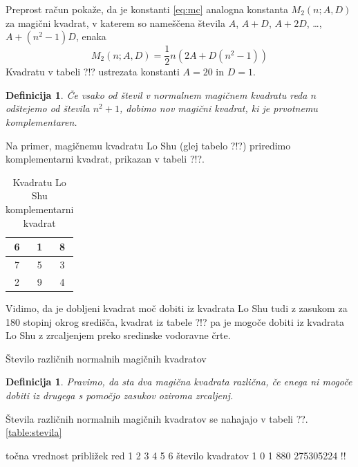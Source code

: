 \documentclass[a4paper,12pt]{article}
\newtheorem{definicija}[izrek]{Definicija}
\begin{document}
Preprost račun pokaže, da je konstanti \eqref{eq:mc} analogna konstanta
$M_2(n;A,D)$ za magični kvadrat, v katerem so nameščena števila
$A$, $A+D$, $A+2D$, \dots, $A+(n^2-1)D$, enaka 
\begin{equation}
   M_2(n; A, D) = \frac{1}{2} n \left( 2A + D(n^2 - 1) \right)
\end{equation}
Kvadratu v tabeli ?!? ustrezata konstanti $A=20$ in $D=1$.

\begin{definicija}
      Če vsako od števil v normalnem magičnem kvadratu reda $n$ odštejemo
      od števila $n^2+1$, dobimo nov magični kvadrat, ki je prvotnemu
      \emph{komplementaren}.
\end{definicija}

Na primer, magičnemu kvadratu Lo Shu (glej tabelo ?!?) priredimo
komplementarni kvadrat, prikazan v tabeli ?!?.
%
\begin{table}[!ht]
   \centering
   \caption{Kvadratu Lo Shu komplementarni kvadrat}
   \label{table:closhu}
   \large
   \begin{tabular}{|*{3}{c|}}
       \hline
       6 & 1 & 8 \\ \hline
       7 & 5 & 3 \\ \hline
       2 & 9 & 4 \\ \hline
   \end{tabular}
\end{table}

Vidimo, da je dobljeni kvadrat moč dobiti iz kvadrata Lo Shu tudi z zasukom za
180 stopinj okrog središča, kvadrat iz tabele ?!? pa je mogoče dobiti
iz kvadrata Lo Shu z zrcaljenjem preko sredinske vodoravne črte.

Število različnih normalnih magičnih kvadratov

\begin{definicija}
      Pravimo, da sta dva magična kvadrata \emph{različna}, če enega ni mogoče dobiti
      iz drugega s pomočjo zasukov oziroma zrcaljenj.
\end{definicija}

Števila različnih normalnih magičnih kvadratov se nahajajo v tabeli ??.
\ref{table:stevila}

      točna vrednost približek
      red 1 2 3 4 5 6
      število kvadratov 1 0 1 880 275305224 !!
\end{document}
